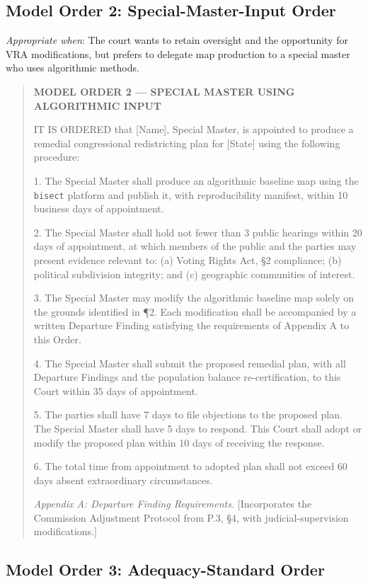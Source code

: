 \subsection{Model Order 2: Special-Master-Input Order}

\textit{Appropriate when}: The court wants to retain oversight and the opportunity for VRA modifications, but prefers to delegate map production to a special master who uses algorithmic methods.

\begin{quote}
\textbf{MODEL ORDER 2 --- SPECIAL MASTER USING ALGORITHMIC INPUT}

IT IS ORDERED that [Name], Special Master, is appointed to produce a remedial congressional redistricting plan for [State] using the following procedure:

1. The Special Master shall produce an algorithmic baseline map using the \texttt{bisect} platform and publish it, with reproducibility manifest, within 10 business days of appointment.

2. The Special Master shall hold not fewer than 3 public hearings within 20 days of appointment, at which members of the public and the parties may present evidence relevant to: (a) Voting Rights Act, \S2 compliance; (b) political subdivision integrity; and (c) geographic communities of interest.

3. The Special Master may modify the algorithmic baseline map solely on the grounds identified in \P2. Each modification shall be accompanied by a written Departure Finding satisfying the requirements of Appendix A to this Order.

4. The Special Master shall submit the proposed remedial plan, with all Departure Findings and the population balance re-certification, to this Court within 35 days of appointment.

5. The parties shall have 7 days to file objections to the proposed plan. The Special Master shall have 5 days to respond. This Court shall adopt or modify the proposed plan within 10 days of receiving the response.

6. The total time from appointment to adopted plan shall not exceed 60 days absent extraordinary circumstances.

\textit{Appendix A: Departure Finding Requirements.} [Incorporates the Commission Adjustment Protocol from P.3, \S4, with judicial-supervision modifications.]
\end{quote}

\subsection{Model Order 3: Adequacy-Standard Order}

